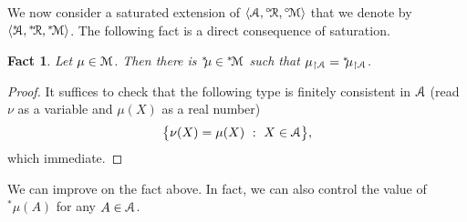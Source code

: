 \documentclass[12pt,letterpaper,oneside,reqno]{amsart}
\newcommand{\mylabel}[1]{{#1}\hfill}
\renewenvironment{itemize}
  {\begin{list}{$\triangleright$}{%
   \setlength{\parskip}{0mm}
   \setlength{\topsep}{.2\baselineskip}
   \setlength{\rightmargin}{0mm}
   \setlength{\listparindent}{0mm}
   \setlength{\itemindent}{0mm}
   \setlength{\labelwidth}{3ex}
   \setlength{\itemsep}{.2\baselineskip}
   \setlength{\parsep}{.2\baselineskip}
   \setlength{\partopsep}{0mm}
   \setlength{\labelsep}{1ex}
   \setlength{\leftmargin}{\labelwidth+\labelsep}
   \let\makelabel\mylabel}}{%
   \end{list}}
\theoremstyle{plain}
\newtheorem{fact}[theorem]{Fact}
\newtheorem{corollary}[theorem]{Corollary}
\theoremstyle{remark}
\begin{document}




We now consider a saturated extension of $\langle{\EuScript A},{}^{\circ\!}{\EuScript R},{}^{\circ\!}{\EuScript M}\rangle$ that we denote by $\langle{}^{*\!\!\!}{\EuScript A},{}^{*\!}{\EuScript R},{}^{*\!}{\EuScript M}\rangle$.
The following fact is a direct consequence of saturation.

\begin{fact}
  Let $\mu\in{\EuScript M}$.
  Then there is ${}^{*\!\!}\mu\in{}^{*\!}{\EuScript M}$ such that $\mu_{\restriction{\EuScript A}}={}^{*\!\!}\mu_{\restriction{\EuScript A}}$.
\end{fact}

\begin{proof}
  It suffices to check that the following type is finitely consistent in ${\EuScript A}$ (read $\nu$ as a variable and $\mu(X)$ as a real number)
  $$
  \big\{\nu(X)=\mu(X) \ :\ X\in{\EuScript A}\big\},
  $$
  which immediate.
\end{proof}

We can improve on the fact above.
In fact, we can also control the value of ${}^{*\!\!}\mu(A)$ for any $A\in{\EuScript A}$.

\def\ceq#1#2#3{\parbox[t]{25ex}{$\displaystyle #1$}\parbox{5ex}{\hfil $#2$}{$\displaystyle #3$}}
\end{document}

